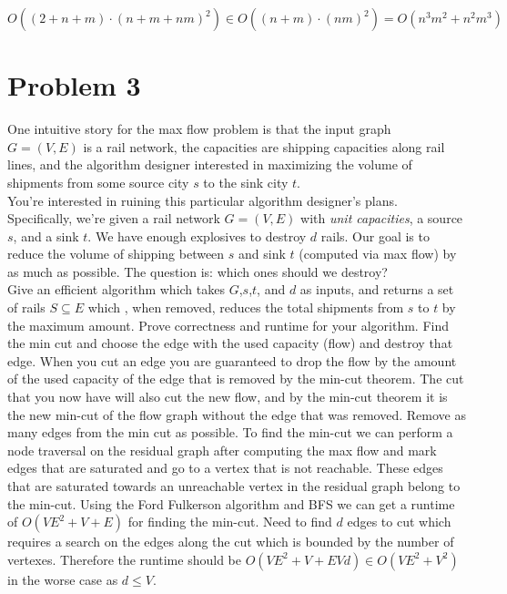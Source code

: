 \documentclass{article}
\begin{document}
$$ O((2+n+m)\cdot(n + m + nm)^2) \in O((n+m)\cdot(nm)^2) = O(n^3m^2 + n^2m^3)$$


\newpage
\section*{Problem 3}
One intuitive story for the max flow problem is that the input graph $G = (V,E)$ is a rail network, the capacities are shipping capacities along rail lines, and the algorithm designer interested in maximizing the volume of shipments from some source city $s$ to the sink city $t$.
\\
\indent You're interested in ruining this particular algorithm designer's plans.
Specifically, we're given a rail network $G = (V,E)$ with \emph{unit capacities}, a source $s$, and a sink $t$.
We have enough explosives to destroy $d$ rails.
Our goal is to reduce the volume of shipping between $s$ and sink $t$ (computed via max flow) by as much as possible.
The question is: which ones should we destroy?
\\
\indent Give an efficient algorithm which takes $G$,$s$,$t$, and $d$ as inputs, and returns a set of rails $S \subseteq E$ which , when removed, reduces the total shipments from $s$ to $t$ by the maximum amount.
Prove correctness and runtime for your algorithm.
\newline
\newline
\indent Find the min cut and choose the edge with the used capacity (flow) and destroy that edge.
When you cut an edge you are guaranteed to drop the flow by the amount of the used capacity of the edge that is removed by the min-cut theorem.
The cut that you now have will also cut the new flow, and by the min-cut theorem it is the new min-cut of the flow graph without the edge that was removed.
Remove as many edges from the min cut as possible.
\newline
\newline
\indent To find the min-cut we can perform a node traversal on the residual graph after computing the max flow and mark edges that are saturated and go to a vertex that is not reachable.
These edges that are saturated towards an unreachable vertex in the residual graph belong to the min-cut.
\newline
\newline
\indent Using the Ford Fulkerson algorithm and BFS we can get a runtime of $O(VE^2 + V + E)$ for finding the min-cut.
Need to find $d$ edges to cut which requires a search on the edges along the cut which is bounded by the number of vertexes.
Therefore the runtime should be $O(VE^2 + V + E Vd) \in O(VE^2 + V^2)$ in the worse case as $d \leq V$.
\end{document}

